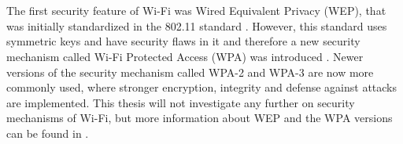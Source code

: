 \\\\
The first security feature of Wi-Fi was Wired Equivalent Privacy (WEP), that was initially standardized in the 802.11 standard \cite{Datacom}. However, this standard uses symmetric keys and have security flaws in it and therefore a new security mechanism called Wi-Fi Protected Access (WPA) was introduced \cite{WAP}. Newer versions of the security mechanism called WPA-2 and WPA-3 are now more commonly used, where stronger encryption, integrity and defense against attacks are implemented. This thesis will not investigate any further on security mechanisms of Wi-Fi, but more information about WEP and the WPA versions can be found in \cite{WAP}. 